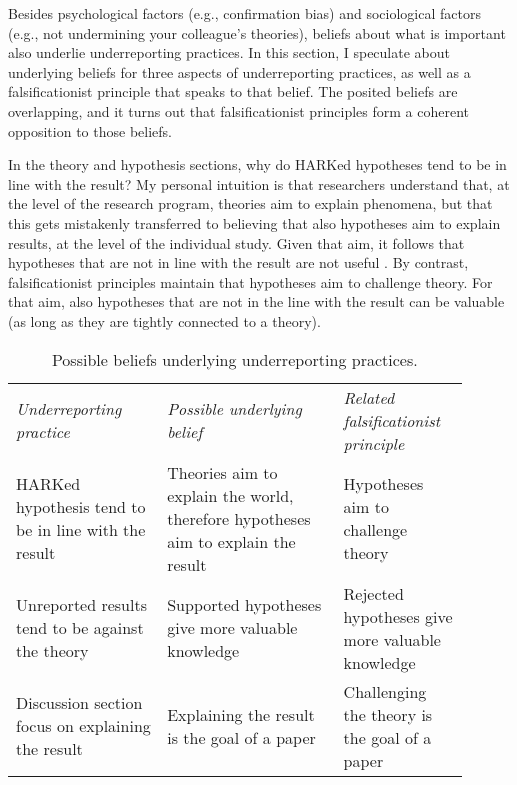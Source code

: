 \documentclass[authordate, meta,issue]{jote-new-article}
\begin{document}
Besides psychological factors (e.g., confirmation bias) and sociological factors (e.g., not undermining your colleague's theories), beliefs about what is important also underlie underreporting practices. In this section, I speculate about underlying beliefs for three aspects of underreporting practices, as well as a falsificationist principle that speaks to that belief. The posited beliefs are overlapping, and it turns out that falsificationist principles form a coherent opposition to those beliefs.



In the theory and hypothesis sections, why do HARKed hypotheses tend to be in line with the result? My personal intuition is that researchers understand that, at the level of the research program, theories aim to explain phenomena, but that this gets mistakenly transferred to believing that also hypotheses aim to explain results, at the level of the individual study. Given that aim, it follows that hypotheses that are not in line with the result are not useful \parencite{Johns2019}. By contrast, falsificationist principles maintain that hypotheses aim to challenge theory. For that aim, also hypotheses that are not in the line with the result can be valuable (as long as they are tightly connected to a theory).


\begin{table}[t!]
  \begin{fullwidth}

    \caption{Possible beliefs underlying underreporting practices.}
    \label{tab:1}

    \begin{tabularx}{\columnwidth}{@{}>{\RaggedRight\arraybackslash}p{0.3\linewidth} >{\RaggedRight\arraybackslash}p{0.35\linewidth} >{\RaggedRight\arraybackslash}p{0.25\linewidth}@{}}

      \emph{Underreporting practice}                       &
      \emph{Possible underlying belief}                    & \emph{Related falsificationist principle}                                                                                            \\
      HARKed hypothesis tend to be in line with the result & Theories aim to explain the world, therefore hypotheses aim to explain the result & Hypotheses aim to challenge theory               \\
      Unreported results tend to be against the theory     & Supported hypotheses give more valuable knowledge                                 & Rejected hypotheses give more valuable knowledge \\
      Discussion section focus on explaining the result    & Explaining the result is the goal of a paper                                      & Challenging the theory is the goal of a paper    \\
    \end{tabularx}
  \end{fullwidth}


\end{table}
\end{document}
